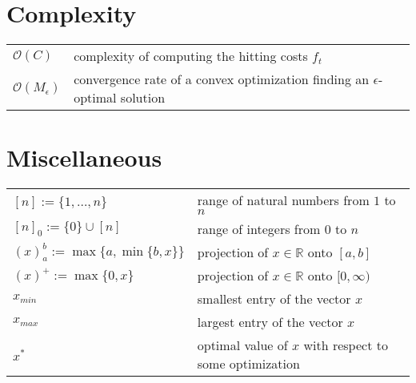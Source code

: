 \section*{Complexity}

\begin{tabularx}{\textwidth}{lX}
    $\mathcal{O}(C)$ & complexity of computing the hitting costs $f_t$ \\
    $\mathcal{O}(M_{\epsilon})$ & convergence rate of a convex optimization finding an $\epsilon$-optimal solution \\
\end{tabularx}

\section*{Miscellaneous}

\begin{tabularx}{\textwidth}{lX}
    $[n] := \{1, \dots, n\}$ & range of natural numbers from $1$ to $n$ \\
    $[n]_0 := \{0\} \cup [n]$ & range of integers from $0$ to $n$ \\
    $(x)_a^b := \max\{a, \min\{b, x\}\}$ & projection of $x \in \mathbb{R}$ onto $[a,b]$ \\
    $(x)^+ := \max\{0, x\}$ & projection of $x \in \mathbb{R}$ onto $[0, \infty)$ \\
    $x_{min}$ & smallest entry of the vector $x$ \\
    $x_{max}$ & largest entry of the vector $x$ \\
    $x^*$ & optimal value of $x$ with respect to some optimization \\
\end{tabularx}
